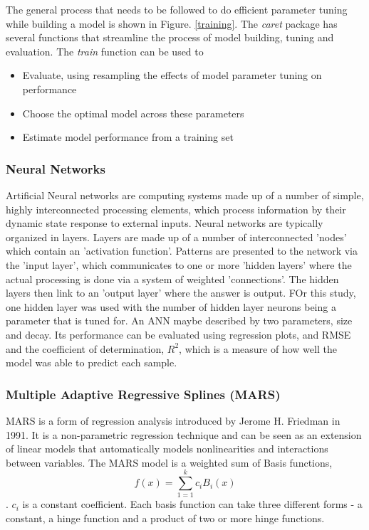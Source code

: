 \documentclass[conference]{IEEEtran}
\begin{document}
The general process that needs to be followed to do efficient parameter tuning while building a model is shown in Figure. \ref{training}. The \textit{caret} package has several functions that streamline the process of model building, tuning and evaluation. The \textit{train} function can be used to 
\begin{itemize}
\item {Evaluate, using resampling the effects of model parameter tuning on performance}
\item {Choose the optimal model across these parameters}
\item{Estimate model performance from a training set}\cite{Model99:online}
\end{itemize}

\subsubsection{Neural Networks}
Artificial Neural networks are computing systems made up of a number of simple, highly interconnected processing elements, which process information by their dynamic state response to external inputs. Neural networks are typically organized in layers. Layers are made up of a number of interconnected 'nodes' which contain an 'activation function'. Patterns are presented to the network via the 'input layer', which communicates to one or more 'hidden layers' where the actual processing is done via a system of weighted 'connections'. The hidden layers then link to an 'output layer' where the answer is output. FOr this study, one hidden layer was used with the number of hidden layer neurons being a parameter that is tuned for. An ANN maybe described by two parameters, size and decay. Its performance can be evaluated using regression plots, and RMSE and the coefficient of determination, $R^2$, which is a measure of how well the model was able to predict each sample.

\subsubsection{Multiple Adaptive Regressive Splines (MARS)}
MARS is a form of regression analysis introduced by Jerome H. Friedman in 1991. It is a non-parametric regression technique and can be seen as an extension of linear models that automatically models nonlinearities and interactions between variables. The MARS model is a weighted sum of Basis functions, $$f(x) = \sum_{1=1}^{k}c_i B_i(x)$$ \cite{friedman1991multivariate}. $c_i$ is a constant coefficient. Each basis function can take three different forms - a constant, a hinge function and a product of two or more hinge functions.
\end{document}
